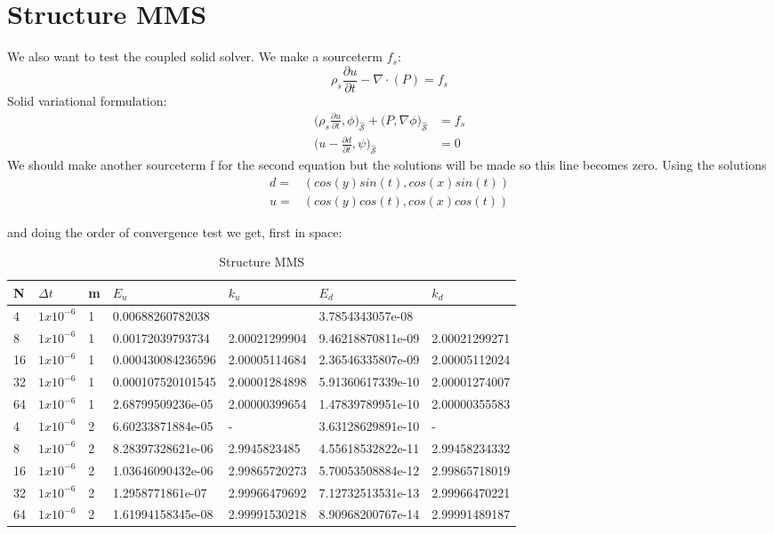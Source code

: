 \section{Structure MMS}
We also want to test the coupled solid solver. We make a sourceterm $f_s$:
$$\rho_s \frac{\partial u}{\partial t} - \nabla \cdot ( P ) = f_s $$
Solid variational formulation:
\begin{align}
\big(\rho_s \frac{\partial u}{\partial t},\phi \big)_{\mathcal{\hat{S}}} + \big(P, \nabla \phi \big)_{\mathcal{\hat{S}}} &=f_s \\
\big( u- \frac{\partial d}{\partial t} ,\psi \big)_{\mathcal{\hat{S}}} &= 0 
\end{align}
We should make another sourceterm f for the second equation but the solutions will be made so this line becomes zero.
Using the solutions 
\begin{align*}
d =& ( cos(y)sin(t) , cos(x)sin(t) )\\
u =& ( cos(y)cos(t), cos(x)cos(t) )
\end{align*}



and doing the order of convergence test we get, first in space:

\begin{table}[h!]
\centering
\caption{Structure MMS}
\label{my-label}
\begin{tabular}{|l|l|l|l|l|l|l|}
\hline
N & $\Delta t$ & m & $E_u$ & $k_u$ & $E_d$ & $k_d$ \\ \hline
4 & $1x10^{-6}$ & 1 & 0.00688260782038 &  & 3.7854343057e-08 &  \\ \hline
8 & $1x10^{-6}$ & 1 & 0.00172039793734 & 2.00021299904 & 9.46218870811e-09 & 2.00021299271 \\ \hline
16 & $1x10^{-6}$ & 1 & 0.000430084236596 & 2.00005114684 & 2.36546335807e-09 & 2.00005112024 \\ \hline
32 & $1x10^{-6}$ & 1 & 0.000107520101545 & 2.00001284898 & 5.91360617339e-10 & 2.00001274007 \\ \hline
64 & $1x10^{-6}$ & 1 & 2.68799509236e-05 & 2.00000399654 & 1.47839789951e-10 & 2.00000355583 \\ \hline
4 & $1x10^{-6}$ & 2 & 6.60233871884e-05 & - & 3.63128629891e-10 & - \\ \hline
8 & $1x10^{-6}$ & 2 & 8.28397328621e-06 & 2.9945823485 & 4.55618532822e-11 & 2.99458234332 \\ \hline
16 & $1x10^{-6}$ & 2 & 1.03646090432e-06 & 2.99865720273 & 5.70053508884e-12 & 2.99865718019 \\ \hline
32 & $1x10^{-6}$ & 2 & 1.2958771861e-07 & 2.99966479692 & 7.12732513531e-13 & 2.99966470221 \\ \hline
64 & $1x10^{-6}$ & 2 & 1.61994158345e-08 & 2.99991530218 & 8.90968200767e-14 & 2.99991489187 \\ \hline
\end{tabular}
\end{table}

